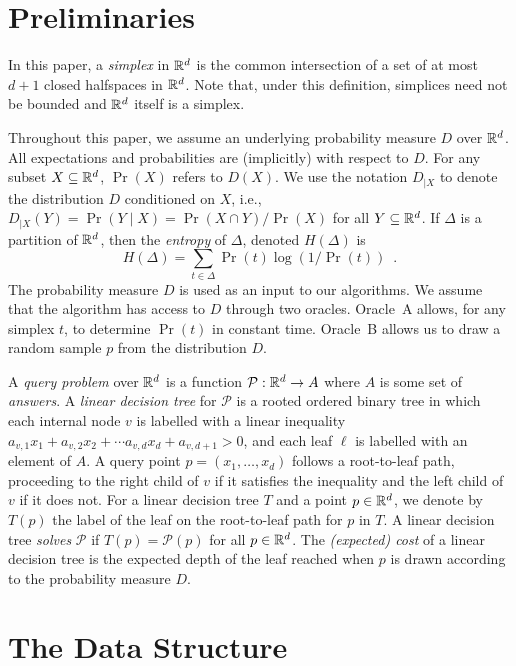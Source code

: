 \documentclass{patmorin}
\begin{document}
\section{Preliminaries}

In this paper, a \emph{simplex} in $\mathbb{R}^d$ is the common intersection of
a set of at most $d+1$ closed halfspaces in $\mathbb{R}^d$. Note that, under this
definition, simplices need not be bounded and $\mathbb{R}^d$ itself is a simplex.

Throughout this paper, we assume an underlying probability measure
$D$ over $\mathbb{R}^d$.  All expectations and probabilities are (implicitly)
with respect to $D$.  For any subset $X\subseteq\mathbb{R}^d$, $\Pr(X)$ refers
to $D(X)$.  We use the notation $D_{|X}$ to denote the distribution $D$
conditioned on $X$, i.e., $D_{|X}(Y)=\Pr(Y\mid X)=\Pr(X\cap Y)/\Pr(X)$
for all $Y\subseteq\mathbb{R}^d$.  If $\Delta$ is a partition of $\mathbb{R}^d$, then
the \emph{entropy} of $\Delta$, denoted $H(\Delta)$ is
\[
    H(\Delta) = \sum_{t\in \Delta} \Pr(t)\log(1/\Pr(t)) \enspace .
\]
The probability measure $D$ is used as an input to our algorithms.
We assume that the algorithm has access to $D$ through two oracles.
Oracle~A allows, for any simplex $t$, to determine $\Pr(t)$ in
constant time.  Oracle~B allows us to draw a random sample $p$ from the
distribution $D$.

A \emph{query problem} over $\mathbb{R}^d$ is a function
$\mathcal{P}:\mathbb{R}^d\rightarrow A$ where $A$ is some set of \emph{answers}.
A \emph{linear decision tree} for $\mathcal{P}$ is a rooted ordered
binary tree in which each internal node $v$ is labelled with a linear
inequality $a_{v,1}x_1 + a_{v,2}x_2 + \cdots a_{v,d}x_d + a_{v,d+1} >
0$, and each leaf $\ell$ is labelled with an element of $A$.  A query
point $p=(x_1,\ldots,x_d)$ follows a root-to-leaf path, proceeding
to the right child of $v$ if it satisfies the inequality and the left
child of $v$ if it does not.  For a linear decision tree $T$ and a point
$p\in\mathbb{R}^d$, we denote by $T(p)$ the label of the leaf on the root-to-leaf
path for $p$ in $T$.  A linear decision tree \emph{solves} $\mathcal{P}$
if $T(p)=\mathcal{P}(p)$ for all $p\in\mathbb{R}^d$.  The \emph{(expected) cost}
of a linear decision tree is the expected depth of the leaf reached when
$p$ is drawn according to the probability measure $D$.

\section{The Data Structure}
\end{document}
